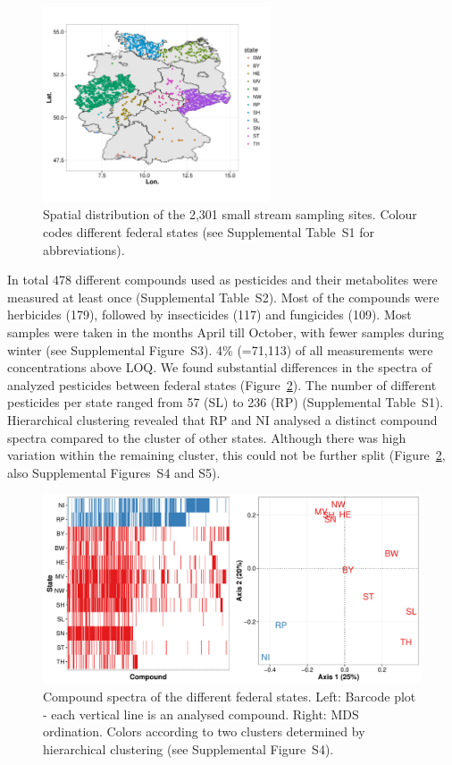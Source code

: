\documentclass[journal=esthag,manuscript=article]{achemso}
\begin{document}
\begin{figure}[ht]
  \includegraphics[width=0.6\textwidth]{figure1.pdf}
  \caption{Spatial distribution of the 2,301 small stream sampling sites. Colour codes different federal states (see Supplemental Table~S1 for abbreviations).}
  \label{fig:fig1}
\end{figure}

In total 478 different compounds used as pesticides and their metabolites were measured at least once (Supplemental Table~S2). 
Most of the compounds were herbicides (179), followed by insecticides (117) and fungicides (109). %
Most samples were taken in the months April till October, with fewer samples during winter (see Supplemental Figure~S3).
4\% (=71,113) of all measurements were concentrations above LOQ.
We found substantial differences in the spectra of analyzed pesticides between federal states (Figure~\ref{fig:fig2}).
The number of different pesticides per state ranged from 57 (SL) to 236 (RP) (Supplemental Table~S1).
Hierarchical clustering revealed that RP and NI analysed a distinct compound spectra compared to the cluster of other states.
Although there was high variation within the remaining cluster, this could not be further split (Figure~\ref{fig:fig2}, also Supplemental Figures~S4 and S5).

\begin{figure}[ht]
  \includegraphics[width=\textwidth]{figure2.pdf}
  \caption{Compound spectra of the different federal states. Left: Barcode plot - each vertical line is an analysed compound. Right: MDS ordination. 
  Colors according to two clusters determined by hierarchical clustering (see Supplemental Figure~S4).}
  \label{fig:fig2}
\end{figure}
\end{document}
